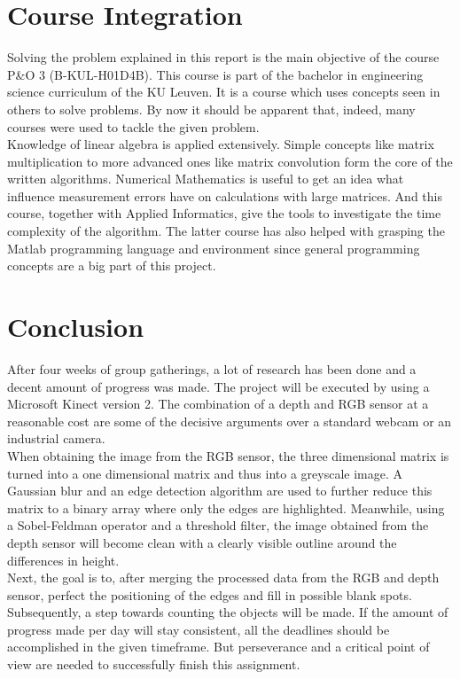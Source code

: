 \documentclass{article}
\begin{document}
\section{Course Integration}
Solving the problem explained in this report is the main objective of the course P\&O 3 (B-KUL-H01D4B). This course is part of the bachelor in engineering science curriculum of the KU Leuven. It is a course which uses concepts seen in others to solve problems. By now it should be apparent that, indeed, many courses were used to tackle the given problem.\\
Knowledge of linear algebra is applied extensively. Simple concepts like matrix multiplication to more advanced ones like matrix convolution form the core of the written algorithms. Numerical Mathematics is useful to get an idea what influence measurement errors have on calculations with large matrices. And this course, together with Applied Informatics, give the tools to investigate the time complexity of the algorithm. The latter course has also helped with grasping the Matlab programming language and environment since general programming concepts are a big part of this project.

\section{Conclusion}
After four weeks of group gatherings, a lot of research has been done and a decent amount of progress was made. The project will be executed by using a Microsoft Kinect version 2. The combination of a depth and RGB sensor at a reasonable cost are some of the decisive arguments over a standard webcam or an industrial camera. \\
When obtaining the image from the RGB sensor, the three dimensional matrix is turned into a one dimensional matrix and thus into a greyscale image. A Gaussian blur and an edge detection algorithm are used to further reduce this matrix to a binary array where only the edges are highlighted. Meanwhile, using a Sobel-Feldman operator and a threshold filter, the image obtained from the depth sensor will become clean with a clearly visible outline around the differences in height. \\
Next, the goal is to, after merging the processed data from the RGB and depth sensor, perfect the positioning of the edges and fill in possible blank spots. Subsequently, a step towards counting the objects will be made. If the amount of progress made per day will stay consistent, all the deadlines should be  accomplished in the given timeframe. But perseverance and a critical point of view are needed to successfully finish this assignment. 
\end{document}
